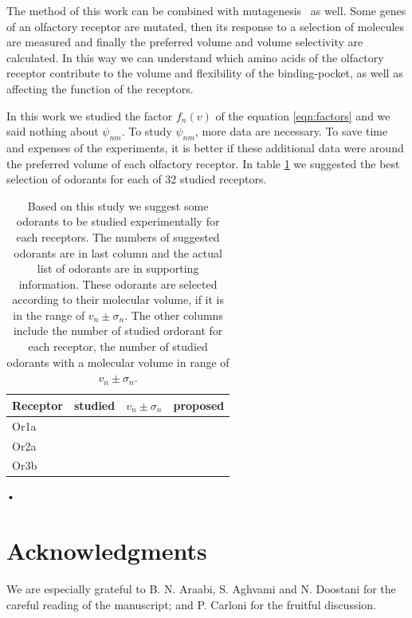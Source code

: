 \documentclass[11pt]{paper} %
\newcommand{\numberofreceptors}{32 }
\begin{document}
The method of this work can be combined with mutagenesis~\cite{} as well. 
Some genes of an olfactory receptor are mutated, 
then its response to a selection of molecules are measured and finally the preferred volume and volume selectivity are calculated.
In this way we can understand which amino acids of the olfactory receptor contribute to the volume and flexibility of the binding-pocket, 
as well as affecting the function of the receptors.

In this work we studied the factor $f_n(v)$ of the equation \ref{eqn:factors} and we said nothing about $\psi_{nm}$. 
To study $\psi_{nm}$, more data are necessary. 
To save time and expenses of the experiments, 
it is better if these additional data were around the preferred volume of each olfactory receptor.
In table \ref{tab:receptor-odorant} we suggested the best selection of odorants for each of \numberofreceptors studied receptors.

\begin{table}
\centering
	\begin{tabular}{|l|r|r|r|}
		\hline 
		Receptor & studied & $v_n \pm \sigma_n$ & proposed\\ \hline 
		Or1a & & & \\
		Or2a & & & \\
		Or3b & & & \\	\hline
	\end{tabular}
	\caption{Based on this study we suggest some odorants to be studied experimentally for each receptors. 		
		The numbers of suggested odorants are in last column and the actual list of odorants are in supporting information.
		These odorants are selected according to their molecular volume, if it is in the range of $v_n \pm \sigma_n$.
		The other columns include the number of studied ordorant for each receptor, 
		the number of studied odorants with a molecular volume in range of $v_n \pm \sigma_n$.}
	\label{tab:receptor-odorant}
\end{table}•

\section{Acknowledgments}
We are especially grateful to B. N. Araabi, S. Aghvami and N. Doostani for the careful reading of the manuscript; and P. Carloni for the fruitful discussion.

\printbibliography
\end{document}
